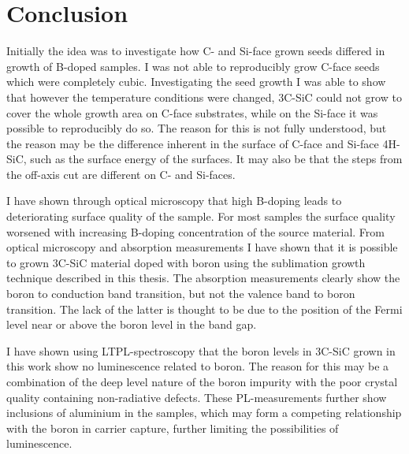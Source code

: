 
\chapter{Conclusion}
Initially the idea was to investigate how C- and Si-face grown seeds differed in growth of B-doped samples. I was not able to reproducibly grow C-face seeds which were completely cubic. Investigating the seed growth I was able to show that however the temperature conditions were changed, 3C-SiC could not grow to cover the whole growth area on C-face substrates, while on the Si-face it was possible to reproducibly do so. The reason for this is not fully understood, but the reason may be the difference inherent in the surface of C-face and Si-face 4H-SiC, such as the surface energy of the surfaces. It may also be that the steps from the off-axis cut are different on C- and Si-faces. %

I have shown through optical microscopy that high B-doping leads to deteriorating surface quality of the sample. For most samples the surface quality worsened with increasing B-doping concentration of the source material. From optical microscopy and absorption measurements I have shown that it is possible to grown 3C-SiC material doped with boron using the sublimation growth technique described in this thesis. The absorption measurements clearly show the boron to conduction band transition, but not the valence band to boron transition. The lack of the latter is thought to be due to the position of the Fermi level near or above the boron level in the band gap. 

I have shown using LTPL-spectroscopy that the boron levels in 3C-SiC grown in this work show no luminescence related to boron. The reason for this may be a combination of the deep level nature of the boron impurity with the poor crystal quality containing non-radiative defects. These PL-measurements further show inclusions of aluminium in the samples, which may form a competing relationship with the boron in carrier capture, further limiting the possibilities of luminescence. 